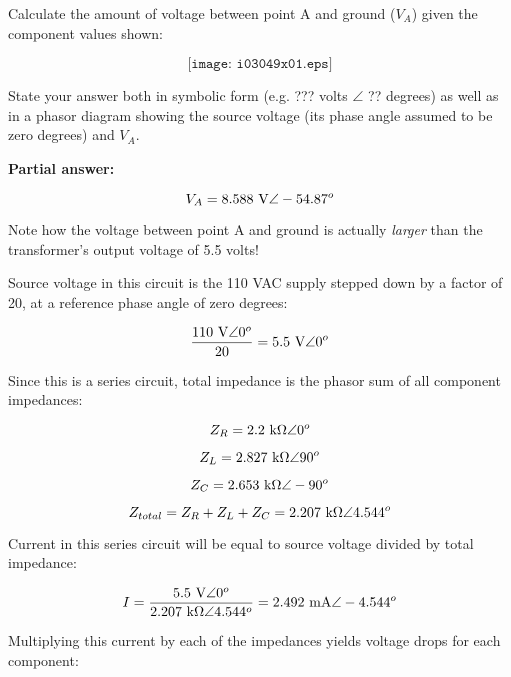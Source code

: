 

Calculate the amount of voltage between point A and ground ($V_A$) given the component values shown:

$$\texttt{[image: i03049x01.eps]}$$

State your answer both in symbolic form (e.g. ??? volts $\angle$ ?? degrees) as well as in a phasor diagram showing the source voltage (its phase angle assumed to be zero degrees) and $V_A$.







\noindent
{\bf Partial answer:}

$$V_A = 8.588 \hbox{ V} \angle -54.87^o$$

Note how the voltage between point A and ground is actually {\it larger} than the transformer's output voltage of 5.5 volts!
 






Source voltage in this circuit is the 110 VAC supply stepped down by a factor of 20, at a reference phase angle of zero degrees:

$${110 \hbox{ V} \angle 0^o \over 20} = 5.5 \hbox{ V} \angle 0^o$$

Since this is a series circuit, total impedance is the phasor sum of all component impedances:

$$Z_R = 2.2 \hbox{ k}\Omega \angle 0^o$$

$$Z_L = 2.827 \hbox{ k}\Omega \angle 90^o$$

$$Z_C = 2.653 \hbox{ k}\Omega \angle -90^o$$

$$Z_{total} = Z_R + Z_L + Z_C = 2.207 \hbox{ k}\Omega \angle 4.544^o$$

Current in this series circuit will be equal to source voltage divided by total impedance:

$$I = {5.5 \hbox{ V} \angle 0^o \over 2.207 \hbox{ k}\Omega \angle 4.544^o} = 2.492 \hbox{ mA} \angle -4.544^o$$

Multiplying this current by each of the impedances yields voltage drops for each component:


